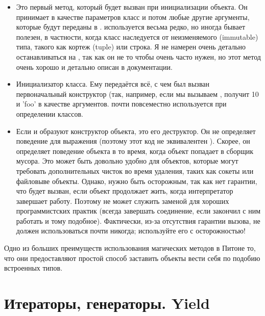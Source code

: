 \begin{itemize}
	\item \pyth{__new__(cls, [...)}
Это первый метод, который будет вызван при инициализации объекта. Он принимает в качестве параметров класс и потом любые другие аргументы, которые будут переданы в .  используется весьма редко, но иногда бывает полезен, в частности, когда класс наследуется от неизменяемого (immutable) типа, такого как кортеж (tuple) или строка. Я не намерен очень детально останавливаться на , так как он не то чтобы очень часто нужен, но этот метод очень хорошо и детально описан в документации.

	\item \pyth{__init__(self, [...)}
Инициализатор класса. Ему передаётся всё, с чем был вызван первоначальный конструктор (так, например, если мы вызываем ,  получит 10 и 'foo' в качестве аргументов.  почти повсеместно используется при определении классов.

	\item {}
Если  и  образуют конструктор объекта,  это его деструктор. Он не определяет поведение для выражения  (поэтому этот код не эквивалентен ). Скорее, он определяет поведение объекта в то время, когда объект попадает в сборщик мусора. Это может быть довольно удобно для объектов, которые могут требовать дополнительных чисток во время удаления, таких как сокеты или файловыве объекты. Однако, нужно быть осторожным, так как нет гарантии, что  будет вызван, если объект продолжает жить, когда интерпретатор завершает работу. Поэтому  не может служить заменой для хороших программистских практик (всегда завершать соединение, если закончил с ним работать и тому подобное). Фактически, из-за отсутствия гарантии вызова,  не должен использоваться почти никогда; используйте его с осторожностью!

\end{itemize}

Одно из больших преимуществ использования магических методов в Питоне то, что они предоставляют простой способ заставить объекты вести себя по подобию встроенных типов.

\section{Итераторы, генераторы. Yield}

